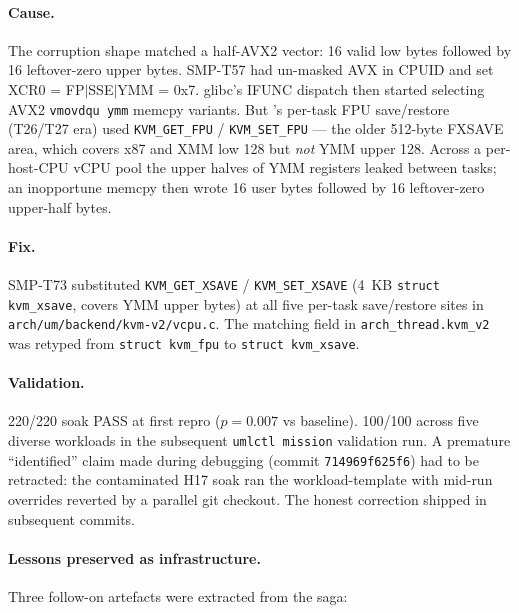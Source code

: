 \paragraph{Cause.} The corruption shape
matched a half-AVX2 vector: 16 valid low bytes followed by 16
leftover-zero upper bytes. SMP-T57 had un-masked AVX in
CPUID and set XCR0 = FP$|$SSE$|$YMM = 0x7. glibc's IFUNC dispatch
then started selecting AVX2 \texttt{vmovdqu ymm} memcpy variants.
But \KVMvTwo{}'s per-task FPU save/restore (T26/T27 era) used
\texttt{KVM\_GET\_FPU} / \texttt{KVM\_SET\_FPU} --- the older
512-byte FXSAVE area, which covers x87 and XMM low 128 but
\emph{not} YMM upper 128. Across a per-host-CPU vCPU pool the
upper halves of YMM registers leaked between tasks; an inopportune
memcpy then wrote 16 user bytes followed by 16 leftover-zero
upper-half bytes.

\paragraph{Fix.} SMP-T73 substituted \texttt{KVM\_GET\_XSAVE} /
\texttt{KVM\_SET\_XSAVE} (4~KB \texttt{struct kvm\_xsave}, covers
YMM upper bytes) at all five per-task save/restore sites in
\texttt{arch/um/backend/kvm-v2/vcpu.c}. The matching field in
\texttt{arch\_thread.kvm\_v2} was retyped from
\texttt{struct kvm\_fpu} to \texttt{struct kvm\_xsave}.

\paragraph{Validation.} 220/220 soak PASS at first repro
($p = 0.007$ vs baseline). 100/100 across five diverse workloads
in the subsequent \texttt{umlctl mission} validation run.
A premature ``identified'' claim made during debugging
(commit \texttt{714969f625f6}) had to be retracted: the
contaminated H17 soak ran the workload-template with mid-run
overrides reverted by a parallel git checkout. The honest
correction shipped in subsequent commits.

\paragraph{Lessons preserved as infrastructure.} Three follow-on
artefacts were extracted from the saga:

